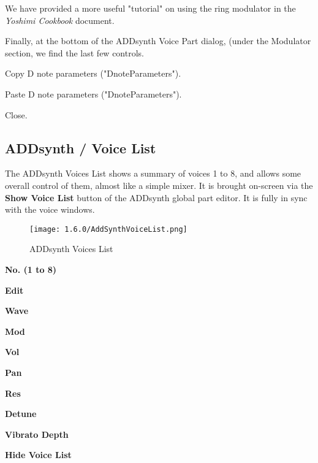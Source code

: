    We have provided a more useful "tutorial" on using the ring modulator in the
   \textsl{Yoshimi Cookbook} \cite{cookbook} document.

   Finally, at the bottom of the ADDsynth Voice Part dialog, (under the Modulator
   section, we find the last few controls.

   \setcounter{ItemCounter}{0}      %

   Copy D note parameters ("DnoteParameters").

   Paste D note parameters ("DnoteParameters").

   Close.


\subsection{ADDsynth / Voice List}
\label{subsec:addsynth_voice_list}

   The ADDsynth Voices List shows a summary of voices 1 to 8, and allows
   some overall control of them, almost like a simple mixer.
   It is brought on-screen via the \textbf{Show Voice List} button
   of the ADDsynth global part editor.
   It is fully in sync with the voice windows.

\begin{figure}[H]
   \centering
   \texttt{[image: 1.6.0/AddSynthVoiceList.png]}
   \caption{ADDsynth Voices List}
   \label{fig:addsynth_voices_list}
\end{figure}

   \begin{enumber}
      \item \textbf{No. (1 to 8)}
      \item \textbf{Edit}
      \item \textbf{Wave}
      \item \textbf{Mod}
      \item \textbf{Vol}
      \item \textbf{Pan}
      \item \textbf{Res}
      \item \textbf{Detune}
      \item \textbf{Vibrato Depth}
      \item \textbf{Hide Voice List}
   \end{enumber}

